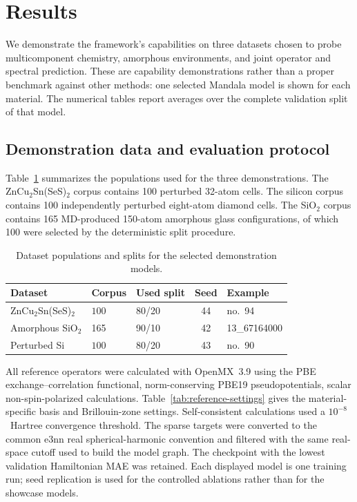 \documentclass[preprint,12pt,compress,numafflabel]{elsarticle}
\begin{document}
\section{Results}
\label{sec:results}

We demonstrate the framework's capabilities on three datasets chosen to probe multicomponent chemistry, amorphous environments, and joint operator and spectral prediction. These are capability demonstrations rather than a proper benchmark against other methods: one selected Mandala model is shown for each material. The numerical tables report averages over the complete validation split of that model.

\subsection{Demonstration data and evaluation protocol}
\label{subsec:demonstration-protocol}

Table~\ref{tab:dataset-protocol} summarizes the populations used for the three demonstrations. The ZnCu$_2$Sn(SeS)$_2$ corpus contains 100 perturbed 32-atom cells. The silicon corpus contains 100 independently perturbed eight-atom diamond cells. The SiO$_2$ corpus contains 165 MD-produced 150-atom amorphous glass configurations, of which 100 were selected by the deterministic split procedure.

\begin{table}[H]
\centering
\small
\caption{Dataset populations and splits for the selected demonstration models.}
\label{tab:dataset-protocol}
\begin{tabular}{p{}p{}p{}cp{}}
\toprule
Dataset & Corpus & Used split & Seed & Example \\
\midrule
ZnCu$_2$Sn(SeS)$_2$ & $100$ & 80/20 & 44 & no.~94\\
Amorphous SiO$_2$ & 165 & 90/10 & 42 & 13\_67164000 \\
Perturbed Si & $100$ & 80/20 & 43 & no.~90 \\
\bottomrule
\end{tabular}
\end{table}

All reference operators were calculated with OpenMX~3.9 using the PBE exchange--correlation functional, norm-conserving PBE19 pseudopotentials, scalar non-spin-polarized calculations. Table~\ref{tab:reference-settings} gives the material-specific basis and Brillouin-zone settings. Self-consistent calculations used a $10^{-8}$~Hartree convergence threshold. The sparse targets were converted to the common e3nn real spherical-harmonic convention and filtered with the same real-space cutoff used to build the model graph. The checkpoint with the lowest validation Hamiltonian MAE was retained. Each displayed model is one training run; seed replication is used for the controlled ablations rather than for the showcase models.
\end{document}
